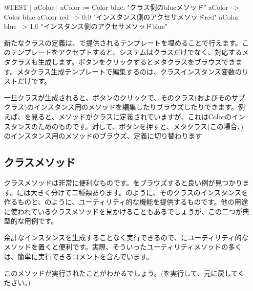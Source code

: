 \documentclass[a4paper,10pt,twoside]{book}
\begin{document}
\begin{code}{@TEST | aColor |}
aColor := Color blue.               "クラス側のblueメソッド"
aColor        --> Color blue
aColor red  --> 0.0         "インスタンス側のアクセサメソッドred"
aColor blue --> 1.0        "インスタンス側のアクセサメソッドblue"
\end{code}

新たなクラスの定義は、で提供されるテンプレートを埋めることで行えます。このテンプレートをアクセプトすると、システムはクラスだけでなく、対応するメタクラスも生成します。ボタンをクリックするとメタクラスをブラウズできます。メタクラス生成テンプレートで編集するのは、クラスインスタンス変数のリストだけです。

一旦クラスが生成されると、ボタンのクリックで、そのクラス(およびそのサブクラス)のインスタンス用のメソッドを編集したりブラウズしたりできます。例えば、を見ると、メソッドがクラスに定義されていますが、これはColorのインスタンスのためのものです。対して、ボタンを押すと、メタクラス(この場合、)のインスタンス用のメソッドのブラウズ、定義に切り替わります

\subsection{クラスメソッド} 

クラスメソッドは非常に便利なものです。をブラウズすると良い例が見つかります。には大きく分けて二種類あります。のように、そのクラスのインスタンスを作るものと、のように、ユーティリティ的な機能を提供するものです。他の用途に使われているクラスメソッドを見かけることもあるでしょうが、この二つが典型的な用例です。

余計なインスタンスを生成することなく実行できるので、にユーティリティ的なメソッドを置くと便利です。実際、そういったユーティリティメソッドの多くは、簡単に実行できるコメントを含んでいます。


このメソッドが実行されたことがわかるでしょう。(を実行して、元に戻してください。)
\end{document}

